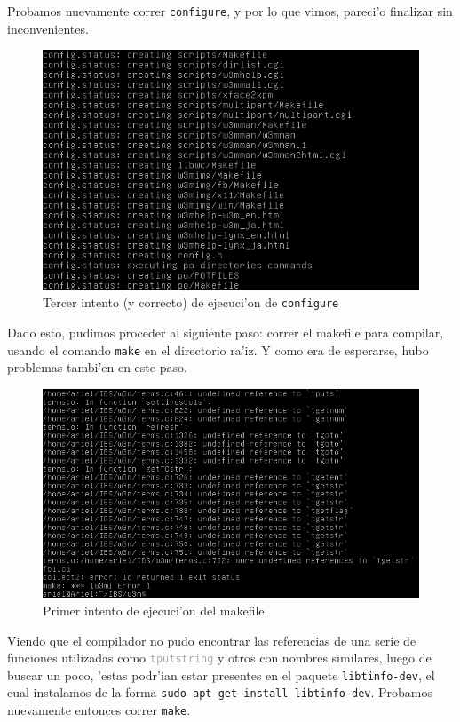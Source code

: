 \documentclass[11pt]{article}
\begin{document}
	Probamos nuevamente correr \texttt{configure}, y por lo que vimos, pareci'o finalizar sin inconvenientes.
	
	\begin{figure}[H]
		\centering \captionsetup{justification=centering}
		\includegraphics[width=.8\linewidth]{Images/Compile_w3m/configure_successful}
		\caption{Tercer intento (y correcto) de ejecuci'on de \texttt{configure}}
		\label{fig:configure_successful}
	\end{figure}
	
	Dado esto, pudimos proceder al siguiente paso: correr el makefile para compilar, usando el comando \texttt{make} en el directorio ra'iz. Y como era de esperarse, hubo problemas tambi'en en este paso.
	
	\begin{figure}[H]
		\centering \captionsetup{justification=centering}
		\includegraphics[width=.8\linewidth]{Images/Compile_w3m/libtinfo-dev_missing}
		\caption{Primer intento de ejecuci'on del makefile}
		\label{fig:libtinfo-dev_missing}
	\end{figure}
	
	Viendo que el compilador no pudo encontrar las referencias de una serie de funciones utilizadas como \texttt{\textcolor{darkgray}{tputstring}} y otros con nombres similares, luego de buscar un poco, 'estas podr'ian estar presentes en el paquete \texttt{libtinfo-dev}, el cual instalamos de la forma \texttt{sudo apt-get install libtinfo-dev}. Probamos nuevamente entonces correr \texttt{make}.
	
\end{document}
